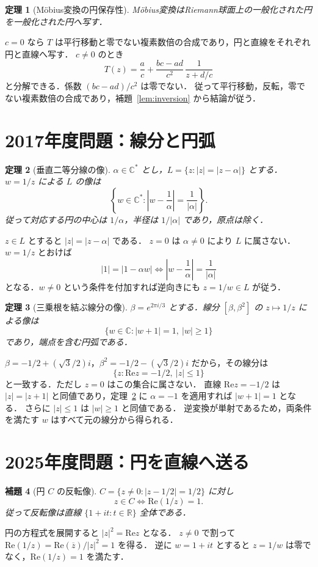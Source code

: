 \documentclass[a5paper,10pt,onecolumn]{jsarticle}
\makeatletter
\theoremstyle{mathnotetheorem}
\newtheorem{theorem}{定理}[section]
\newtheorem{lemma}[theorem]{補題}
\renewcommand{\proofname}{証明}
\renewenvironment{proof}[1][\proofname]{%
  \par\pushQED{\qed}\normalfont\topsep4\p@\@plus2\p@\relax
  \trivlist\item[\hskip\labelsep\bfseries #1]\ignorespaces
}{\popQED\endtrivlist\@endpefalse}
\makeatother
\begin{document}
\begin{theorem}[M\"obius変換の円保存性]\label{thm:circle}
M\"obius変換はRiemann球面上の一般化された円を一般化された円へ写す．
\end{theorem}
\begin{proof}
$c=0$ なら $T$ は平行移動と零でない複素数倍の合成であり，円と直線をそれぞれ円と直線へ写す．
$c\ne0$ のとき
\[
 T(z)=\frac ac+\frac{bc-ad}{c^2}\,
 \frac1{z+d/c}
\]
と分解できる．係数 $(bc-ad)/c^2$ は零でない．
従って平行移動，反転，零でない複素数倍の合成であり，補題~\ref{lem:inversion} から結論が従う．
\end{proof}

\section{2017年度問題：線分と円弧}
\begin{theorem}[垂直二等分線の像]\label{thm:2017a}
$\alpha\in\mathbb C^*$ とし，$L=\{z:|z|=|z-\alpha|\}$ とする．
$w=1/z$ による $L$ の像は
\[
 \left\{w\in\mathbb C^*:\left|w-\frac1\alpha\right|
 =\frac1{|\alpha|}\right\}.
\]
従って対応する円の中心は $1/\alpha$，半径は $1/|\alpha|$ であり，原点は除く．
\end{theorem}
\begin{proof}
$z\in L$ とすると $|z|=|z-\alpha|$ である．
$z=0$ は $\alpha\ne0$ により $L$ に属さない．
$w=1/z$ とおけば
\[
 |1|=|1-\alpha w|
 \iff\left|w-\frac1\alpha\right|=\frac1{|\alpha|}
\]
となる．$w\ne0$ という条件を付加すれば逆向きにも $z=1/w\in L$ が従う．
\end{proof}

\begin{theorem}[三乗根を結ぶ線分の像]\label{thm:2017b}
$\beta=e^{2\pi i/3}$ とする．線分 $[\beta,\beta^2]$ の $z\mapsto1/z$ による像は
\[
 \{w\in\mathbb C:|w+1|=1,\ |w|\ge1\}
\]
であり，端点を含む円弧である．
\end{theorem}
\begin{proof}
$\beta=-1/2+(\sqrt3/2)i$，$\beta^2=-1/2-(\sqrt3/2)i$ だから，その線分は
\[
 \{z:\mathrm{Re}z=-1/2,\ |z|\le1\}
\]
と一致する．ただし $z=0$ はこの集合に属さない．
直線 $\mathrm{Re}z=-1/2$ は $|z|=|z+1|$ と同値であり，定理~\ref{thm:2017a} に $\alpha=-1$ を適用すれば $|w+1|=1$ となる．
さらに $|z|\le1$ は $|w|\ge1$ と同値である．
逆変換が単射であるため，両条件を満たす $w$ はすべて元の線分から得られる．
\end{proof}

\section{2025年度問題：円を直線へ送る}
\begin{lemma}[円 $C$ の反転像]\label{lem:C}
$C=\{z\ne0:|z-1/2|=1/2\}$ に対し
\[
 z\in C\iff\mathrm{Re}(1/z)=1.
\]
従って反転像は直線 $\{1+it:t\in\mathbb R\}$ 全体である．
\end{lemma}
\begin{proof}
円の方程式を展開すると $|z|^2=\mathrm{Re}z$ となる．
$z\ne0$ で割って
$\mathrm{Re}(1/z)=\mathrm{Re}(\overline z)/|z|^2=1$ を得る．
逆に $w=1+it$ とすると $z=1/w$ は零でなく，$\mathrm{Re}(1/z)=1$ を満たす．
\end{proof}
\end{document}
